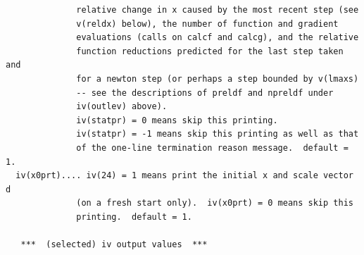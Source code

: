 \documentclass[11pt,twoside]{article}
\begin{document}
\begin{verbatim}
              relative change in x caused by the most recent step (see
              v(reldx) below), the number of function and gradient
              evaluations (calls on calcf and calcg), and the relative
              function reductions predicted for the last step taken and
              for a newton step (or perhaps a step bounded by v(lmaxs)
              -- see the descriptions of preldf and npreldf under
              iv(outlev) above).
              iv(statpr) = 0 means skip this printing.
              iv(statpr) = -1 means skip this printing as well as that
              of the one-line termination reason message.  default = 1.
  iv(x0prt).... iv(24) = 1 means print the initial x and scale vector d
              (on a fresh start only).  iv(x0prt) = 0 means skip this
              printing.  default = 1.

   ***  (selected) iv output values  ***


\end{verbatim}
\end{document}
